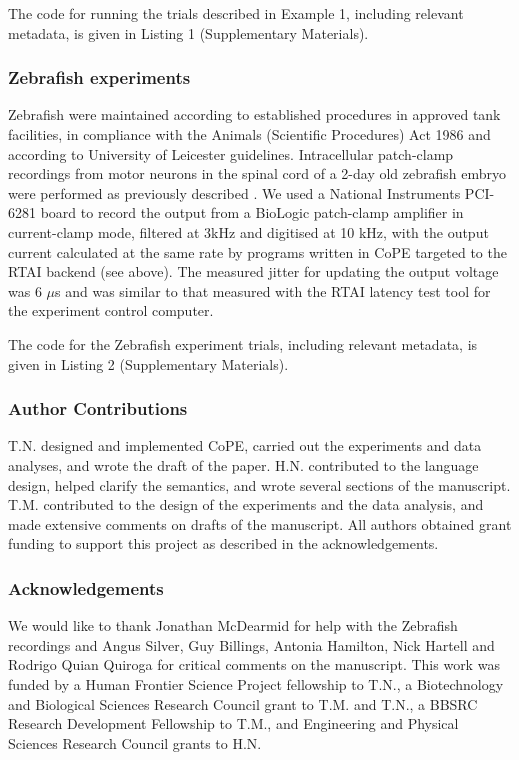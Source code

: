 The code for running the trials described in Example 1, including relevant metadata,
is given in Listing 1 (Supplementary Materials).

\subsubsection*{Zebrafish experiments}

Zebrafish were maintained according to established procedures
\citep{Westerfield1994} in approved tank facilities, in compliance
with the Animals (Scientific Procedures) Act 1986 and according to
University of Leicester guidelines. Intracellular patch-clamp
recordings from motor neurons in the spinal cord of a 2-day old
zebrafish embryo were performed as previously described
\citep{McDearmid2006}. We used a National Instruments PCI-6281 board
to record the output from a BioLogic patch-clamp amplifier in
current-clamp mode, filtered at 3kHz and digitised at 10 kHz, with the
output current calculated at the same rate by programs written in
CoPE targeted to the RTAI backend (see
above). The measured jitter for updating the output voltage was 6
$\mu$s and was similar to that measured with the RTAI latency test
tool for the experiment control computer.

The code for the Zebrafish experiment trials, including relevant
metadata, is given in Listing 2 (Supplementary Materials).

\subsubsection*{Author Contributions}  

T.N. designed and implemented CoPE, carried out the experiments and
data analyses, and wrote the draft of the paper. H.N. contributed to
the language design, helped clarify the semantics, and wrote several
sections of the manuscript. T.M. contributed to the design of the
experiments and the data analysis, and made extensive comments on
drafts of the manuscript. All authors obtained grant funding to
support this project as described in the acknowledgements.

\subsubsection*{Acknowledgements}  

We would like to thank Jonathan McDearmid for help with the Zebrafish
recordings and Angus Silver, Guy Billings, Antonia Hamilton, Nick
Hartell and Rodrigo Quian Quiroga for critical comments on the
manuscript. This work was funded by a Human Frontier Science Project
fellowship to T.N., a Biotechnology and Biological Sciences Research
Council grant to T.M. and T.N., a BBSRC Research Development
Fellowship to T.M., and Engineering and Physical Sciences Research
Council grants to H.N.



